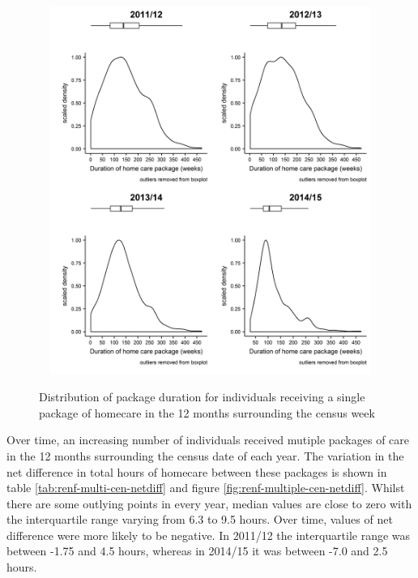 \documentclass[]{article}
\begin{document}
\begin{figure}[]
  \centering
    \caption{Distribution of package duration for individuals receiving a single package of homecare in the 12 months surrounding the census week}
    \includegraphics[height = 12cm, width = 16cm]{figures/chapter-renf/15-census-singles-length.png}
    \label{fig:renf-single-cen-distribution}
\end{figure}

Over time, an increasing number of individuals received mutiple packages
of care in the 12 months surrounding the census date of each year. The
variation in the net difference in total hours of homecare between these
packages is shown in table \ref{tab:renf-multi-cen-netdiff} and figure
\ref{fig:renf-multiple-cen-netdiff}. Whilst there are some outlying
points in every year, median values are close to zero with the
interquartile range varying from 6.3 to 9.5 hours. Over time, values of
net difference were more likely to be negative. In 2011/12 the
interquartile range was between -1.75 and 4.5 hours, whereas in 2014/15
it was between -7.0 and 2.5 hours.
\end{document}
